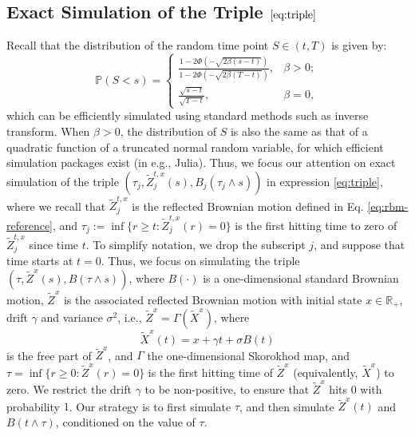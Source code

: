 \documentclass[11pt]{article}
\theoremstyle{definition}
\theoremstyle{plain}
\newcommand{\R}{\mathbb{R}}
\newcommand{\pr}{\mathbb{P}}
\begin{document}
\begin{appendices}
\section{Exact Simulation of the Triple \texorpdfstring{$\eqref{eq:triple}$}{(88)}}\label{sec:exact-simulation}
Recall that the distribution of the random time point $S \in (t, T)$ is given by:
\begin{equation}
\pr(S < s) = \left\{
\begin{array}{ll}
\frac{1-2\Phi\left(-\sqrt{2\beta(s-t)}\right)}{1-2\Phi\left(-\sqrt{2\beta(T-t)}\right)}, & \beta > 0; \\
\frac{\sqrt{s-t}}{\sqrt{T-t}}, & \beta = 0,
\end{array}\right.
\end{equation}
which can be efficiently simulated using standard methods such as inverse transform. 
When $\beta >0$, the distribution of $S$ is also the same as that of a quadratic function of a truncated normal random variable, 
for which efficient simulation packages exist (in e.g., Julia).
Thus, we focus our attention on exact simulation of the triple $\left(\tau_j, \tilde Z^{t,x}_j(s), B_j(\tau_j\wedge s)\right)$ in expression \eqref{eq:triple}, 
where we recall that $\tilde Z_j^{t,x}$ is the reflected Brownian motion defined in Eq. \eqref{eq:rbm-reference}, and
$\tau_j:= \inf\{r \ge t : \tilde Z_j^{t,x}(r) = 0\}$ is the first hitting time to zero of $\tilde Z_j^{t,x}$ since time $t$. 
To simplify notation, we drop the subscript $j$, and suppose that time starts at $t=0$. 
Thus, we focus on simulating the triple $\left(\tau, \tilde Z^x(s), B(\tau\wedge s)\right)$, 
where $B(\cdot)$ is a one-dimensional standard Brownian motion, $\tilde Z^x$ is the associated reflected Brownian motion with initial state $x \in \R_+$, 
drift $\gamma$ and variance $\sigma^2$, i.e., $\tilde Z^x = \Gamma(\tilde X^x)$, where 
\[
\tilde X^x(t) = x + \gamma t + \sigma B(t)
\]
is the free part of $\tilde Z^x$, and $\Gamma$ the one-dimensional Skorokhod map, 
and $\tau = \inf\{r \ge 0: \tilde Z^x(r) = 0\}$ is the first hitting time of $\tilde Z^x$ (equivalently, $\tilde X^x$) to zero. 
We restrict the drift $\gamma$ to be non-positive, to ensure that $\tilde Z^x$ hits $0$ with probability $1$. 
Our strategy is to first simulate $\tau$, and then simulate 
$\tilde Z^x(t)$ and $B(t\wedge \tau)$, conditioned on the value of $\tau$. 


\end{appendices}
\end{document}

